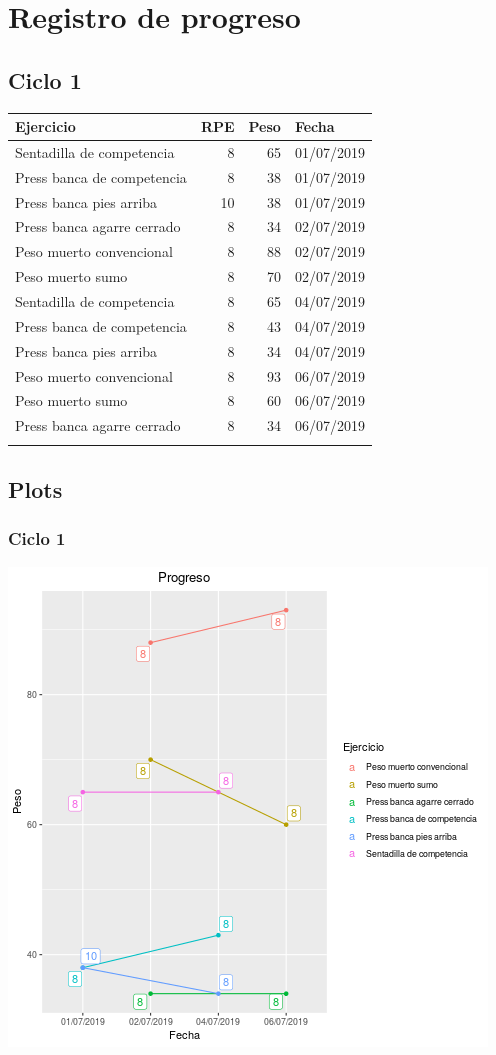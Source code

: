 \documentclass[11pt]{article}
\begin{document}
\section{Registro de progreso}
\label{sec:orgcc703a5}
\subsection{Ciclo 1}
\label{sec:org069291e}
\begin{center}
\label{tab:org8310e3e}
\begin{tabular}{lrrl}
Ejercicio & RPE & Peso & Fecha\\
\hline
Sentadilla de competencia & 8 & 65 & 01/07/2019\\
Press banca de competencia & 8 & 38 & 01/07/2019\\
Press banca pies arriba & 10 & 38 & 01/07/2019\\
Press banca agarre cerrado & 8 & 34 & 02/07/2019\\
Peso muerto convencional & 8 & 88 & 02/07/2019\\
Peso muerto sumo & 8 & 70 & 02/07/2019\\
Sentadilla de competencia & 8 & 65 & 04/07/2019\\
Press banca de competencia & 8 & 43 & 04/07/2019\\
Press banca pies arriba & 8 & 34 & 04/07/2019\\
Peso muerto convencional & 8 & 93 & 06/07/2019\\
Peso muerto sumo & 8 & 60 & 06/07/2019\\
Press banca agarre cerrado & 8 & 34 & 06/07/2019\\
 &  &  & \\
\end{tabular}
\end{center}
\subsection{Plots}
\label{sec:orgf8b19cc}
\subsubsection{Ciclo 1}
\label{sec:org0d540cc}
\begin{center}
\includegraphics[width=.9\linewidth]{tmp.png}
\end{center}
\end{document}

